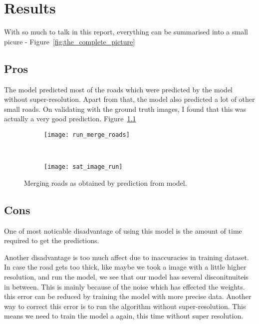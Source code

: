 
\chapter{Results}\label{chapt:results}

With so much to talk in this report, everything can be summarised into a small picure - Figure~\ref{fig:the_complete_picture}

\section{Pros}
The model predicted most of the roads which were predicted by the model without super-resolution. Apart from that, the model also predicted a lot of other small roads. On validating with the ground truth images, I found that this was actually a very good prediction. Figure~\ref{fig:run_merge_road_maps}

\begin{figure}[h!]
  \centering
  \begin{subfigure}{0.71\textwidth}
    \texttt{[image: run\_merge\_roads]}
    \caption{}
  \end{subfigure}~
  \begin{subfigure}{0.29\textwidth}
    \texttt{[image: sat\_image\_run]}
    \caption{}
  \end{subfigure}
  \caption[Finding likeliness of roads by combining results from different models]{Merging roads as obtained by prediction from model.}
  \label{fig:run_merge_road_maps}
\end{figure}



\section{Cons}
One of most noticable disadvantage of using this model is the amount of time required to get the predictions. 

Another disadvantage is too much affect due to inaccuracies in training dataset. In case the road gets too thick, like maybe we took a image with a little higher resolution, and run the model, we see that our model has several disconitnuiteis in between. This is mainly because of the noise which has effected the weights. this error can be reduced by training the model with more precise data. Another way to correct this error is to run the algorithm without super-resolution. This means we need to train the model a again, this time without super resolution.

